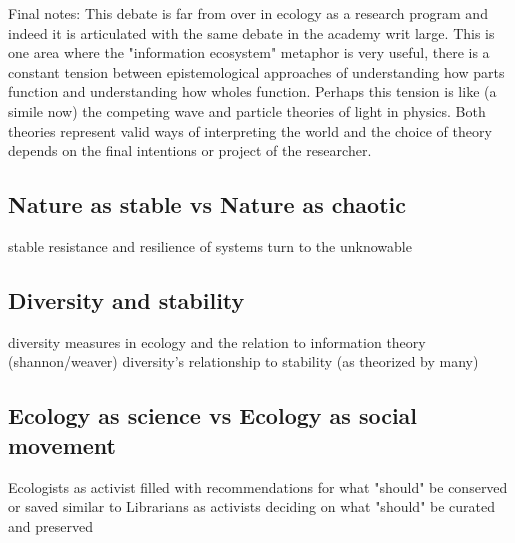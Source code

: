 Final notes: This debate is far from over in ecology as a research program and indeed it is articulated with the same debate in the academy writ large. This is one area where the "information ecosystem" metaphor is very useful, there is a constant tension between epistemological approaches of understanding how  parts function and understanding how wholes function. Perhaps this tension is like (a simile now) the competing wave and particle theories of light in physics. Both theories represent valid ways of interpreting the world and the choice of theory depends on the final intentions or project of the researcher.

\subsection{Nature as stable vs Nature as chaotic}

stable \cite{odum_1953} 
resistance and resilience of systems \cite{holling_1973}
turn to the unknowable\cite{barbour_1996}

\subsection{Diversity and stability}

diversity measures in ecology and the relation to information theory (shannon/weaver)
diversity's relationship to stability (as theorized by many)

\subsection{Ecology as science vs Ecology as social movement}

Ecologists as activist filled with recommendations for what "should" be conserved or saved similar to Librarians as activists deciding on what "should" be curated and preserved
